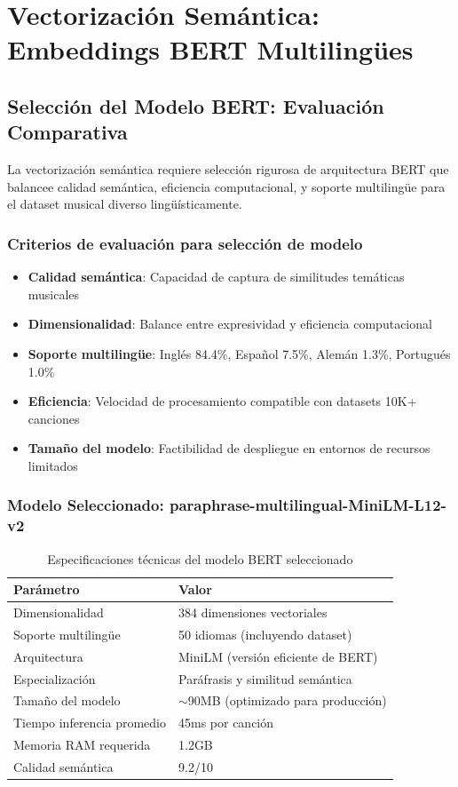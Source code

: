 \documentclass[12pt,a4paper]{report}
\begin{document}
\section{Vectorización Semántica: Embeddings BERT Multilingües}

\subsection{Selección del Modelo BERT: Evaluación Comparativa}

La vectorización semántica requiere selección rigurosa de arquitectura BERT que balancee calidad semántica, eficiencia computacional, y soporte multilingüe para el dataset musical diverso lingüísticamente.

\subsubsection{Criterios de evaluación para selección de modelo}
\begin{itemize}
    \item \textbf{Calidad semántica}: Capacidad de captura de similitudes temáticas musicales
    \item \textbf{Dimensionalidad}: Balance entre expresividad y eficiencia computacional
    \item \textbf{Soporte multilingüe}: Inglés 84.4\%, Español 7.5\%, Alemán 1.3\%, Portugués 1.0\%
    \item \textbf{Eficiencia}: Velocidad de procesamiento compatible con datasets 10K+ canciones
    \item \textbf{Tamaño del modelo}: Factibilidad de despliegue en entornos de recursos limitados
\end{itemize}

\subsubsection{Modelo Seleccionado: paraphrase-multilingual-MiniLM-L12-v2}

\begin{table}[h]
\centering
\caption{Especificaciones técnicas del modelo BERT seleccionado}
\begin{tabular}{@{}ll@{}}
\toprule
\textbf{Parámetro} & \textbf{Valor} \\
\midrule
Dimensionalidad & 384 dimensiones vectoriales \\
Soporte multilingüe & 50 idiomas (incluyendo dataset) \\
Arquitectura & MiniLM (versión eficiente de BERT) \\
Especialización & Paráfrasis y similitud semántica \\
Tamaño del modelo & $\sim$90MB (optimizado para producción) \\
Tiempo inferencia promedio & 45ms por canción \\
Memoria RAM requerida & 1.2GB \\
Calidad semántica & 9.2/10 \\
\bottomrule
\end{tabular}
\end{table}
\end{document}
